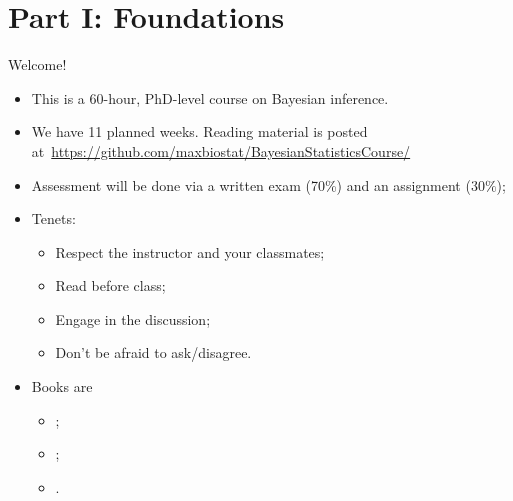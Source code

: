 \begin{frame}
\titlepage %
\end{frame}
\section{Part I: Foundations}
\begin{frame}{Welcome!}
\begin{itemize}
 \item This is a 60-hour, PhD-level course on Bayesian inference.
 \item We have 11 planned weeks. Reading material is posted at~\url{https://github.com/maxbiostat/BayesianStatisticsCourse/}
 \item Assessment will be done via a written exam (70\%) and an assignment ($30\%$);
 \item Tenets:
 \begin{itemize}
  \item Respect the instructor and your classmates;
  \item Read before class;
  \item Engage in the discussion;
  \item Don't be afraid to ask/disagree.
 \end{itemize}
 \item Books are
 \begin{itemize}
  \item  \cite{Robert2007};
  \item \cite{Hoff2009};
  \item \cite{Bernardo2000}.  
 \end{itemize}
\end{itemize}
\end{frame}

